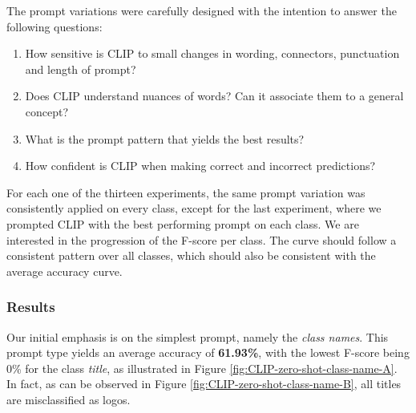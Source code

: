 The prompt variations were carefully designed with the intention to answer the following questions:
\begin{enumerate}
    \item How sensitive is CLIP to small changes in wording, connectors, punctuation and length of prompt?
    \item Does CLIP understand nuances of words? Can it associate them to a general concept?
    \item What is the prompt pattern that yields the best results?
    \item How confident is CLIP when making correct and incorrect predictions?
\end{enumerate}

For each one of the thirteen experiments, the same prompt variation was consistently applied on every class, except for the last experiment, where we prompted CLIP with the best performing prompt on each class. We are interested in the progression of the F-score per class. The curve should follow a consistent pattern over all classes, which should also be consistent with the average accuracy curve. 

\subsubsection{Results}
Our initial emphasis is on the simplest prompt, namely the \textit{class names}. This prompt type yields an average accuracy of \textbf{61.93\%}, with the lowest F-score being 0\% for the class \textit{title}, as illustrated in Figure \ref{fig:CLIP-zero-shot-class-name-A}. In fact, as can be observed in Figure \ref{fig:CLIP-zero-shot-class-name-B}, all titles are misclassified as logos.

